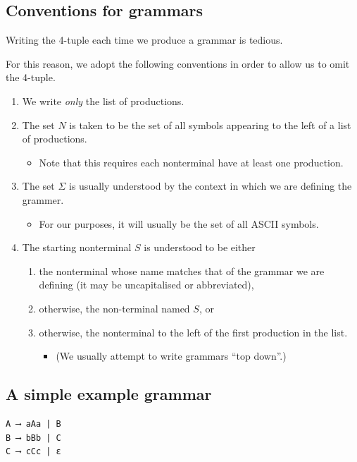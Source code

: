 \documentclass[11pt]{article}
\theoremstyle{definition}
\begin{document}
\subsection{Conventions for grammars}
\label{sec:orgd1c7c74}

Writing the 4-tuple each time we produce a grammar is tedious.

For this reason, we adopt the following conventions
in order to allow us to omit the 4-tuple.
\begin{enumerate}
\item We write \emph{only} the list of productions.
\item The set \(N\) is taken to be the set of all symbols
appearing to the left of a list of productions.
\begin{itemize}
\item Note that this requires each nonterminal have
at least one production.
\end{itemize}
\item The set \(Σ\) is usually understood by the context
in which we are defining the grammer.
\begin{itemize}
\item For our purposes, it will usually be the set of
all ASCII symbols.
\end{itemize}
\item The starting nonterminal \(S\) is understood to be either
\begin{enumerate}
\item the nonterminal whose name matches that of the grammar
we are defining (it may be uncapitalised or abbreviated),
\item otherwise, the non-terminal named \(S\), or
\item otherwise, the nonterminal to the left of
the first production in the list.
\begin{itemize}
\item (We usually attempt to write grammars “top down”.)
\end{itemize}
\end{enumerate}
\end{enumerate}

\subsection{A simple example grammar}
\label{sec:org8d31730}

\begin{verbatim}
A ⟶ aAa | B
B ⟶ bBb | C
C ⟶ cCc | ε
\end{verbatim}
\end{document}
